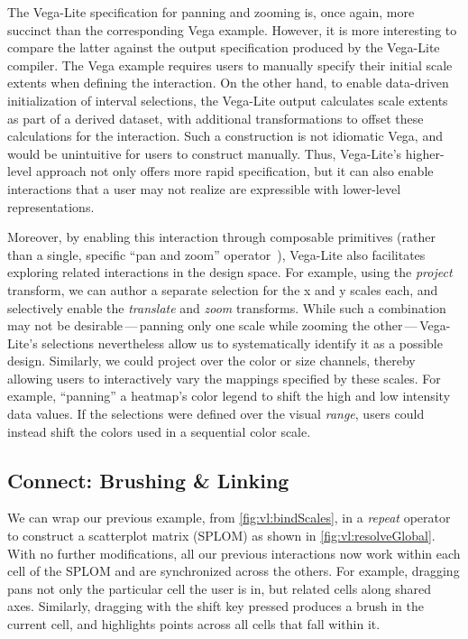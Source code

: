 The Vega-Lite specification for panning and zooming is, once again, more
succinct than the corresponding Vega example. However, it is more interesting to
compare the latter against the output specification produced by the Vega-Lite
compiler. The Vega example requires users to manually specify their initial
scale extents when defining the interaction. On the other hand, to enable
data-driven initialization of interval selections, the Vega-Lite output
calculates scale extents as part of a derived dataset, with additional
transformations to offset these calculations for the interaction. Such a
construction is not idiomatic Vega, and would be unintuitive for users to
construct manually. Thus, Vega-Lite's higher-level approach not only offers more
rapid specification, but it can also enable interactions that a user may not
realize are expressible with lower-level representations.

Moreover, by enabling this interaction through composable primitives (rather
than a single, specific ``pan and zoom'' operator~\cite{bostock:d3}), Vega-Lite
also facilitates exploring related interactions in the design space. For
example, using the \emph{project} transform, we can author a separate selection
for the x and y scales each, and selectively enable the \emph{translate} and
\emph{zoom} transforms. While such a combination may not be
desirable\,---\,panning only one scale while zooming the other\,---\,Vega-Lite's
selections nevertheless allow us to systematically identify it as a possible
design. Similarly, we could project over the color or size channels, thereby
allowing users to interactively vary the mappings specified by these scales. For
example, ``panning'' a heatmap's color legend to shift the high and low
intensity data values. If the selections were defined over the visual
\emph{range}, users could instead shift the colors used in a sequential color
scale.

\vspace{-10pt}

\subsection{Connect: Brushing \& Linking}

\vspace{-7pt}

We can wrap our previous example, from \cref{fig:vl:bindScales}, in a
\emph{repeat} operator to construct a scatterplot matrix (SPLOM) as shown in
\cref{fig:vl:resolveGlobal}. With no further modifications, all our previous
interactions now work within each cell of the SPLOM and are synchronized across
the others. For example, dragging pans not only the particular cell the user is
in, but related cells along shared axes. Similarly, dragging with the shift key
pressed produces a brush in the current cell, and highlights points across all
cells that fall within it.

